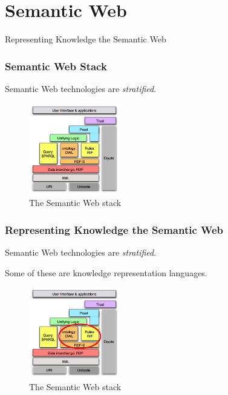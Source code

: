 \documentclass[8pt]{beamer}
\begin{document}
\section{Semantic Web}

\begin{frame}
 \Large{Representing Knowledge the Semantic Web}
\end{frame}

\begin{frame}
 \frametitle{Semantic Web Stack}
 Semantic Web technologies are \emph{stratified}.
 \vspace{\baselineskip}
 
 \phantom{Some of such technologies are knowledge representation languages.}
 \vspace{\baselineskip}
 
 \begin{figure}
 \includegraphics[height=150px]{SemWebStack-tbl-2006a.png}
 \caption{The Semantic Web stack}
 \end{figure}

\end{frame}

\begin{frame}
 \frametitle{Representing Knowledge the Semantic Web}
 Semantic Web technologies are \emph{stratified}.
 \vspace{\baselineskip}
 
 Some of these are knowledge representation languages.
 \vspace{\baselineskip}
 
 \begin{figure}
 \includegraphics[height=150px]{SemWebStack-tbl-2006a_kr.png}
 \caption{The Semantic Web stack}
 \end{figure}

\end{frame}
\end{document}
